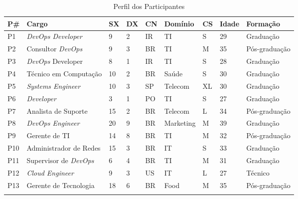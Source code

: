 \begin{table}[t]
\centering
\caption{Perfil dos Participantes}
\label{participant_table}
\begin{tabular}{|p{0.6cm}|p{3.4cm}|p{0.5cm}|p{0.5cm}|p{0.5cm}|p{1.7cm}|p{0.5cm}|p{1cm}|p{2.7cm}|}
\hline \centering
{\bf P\#} & {\bf Cargo} & {\bf SX} & {\bf DX} & {\bf CN} & {\bf Domínio} & {\bf CS} & {\bf Idade} & {\bf Formação} \\ \hline \centering
P1 & {\it DevOps Developer} & 9 & 2 & IR & \acrshort{TI} & S & 29 & Graduação \\ \hline \centering

P2 & Consultor {\it DevOps} & 9 & 3 & BR & \acrshort{TI} & M & 35 & Pós-graduação \\ \hline \centering

P3 & {\it DevOps} Developer & 8 & 1 & IR & \acrshort{TI} & S & 28 & Graduação \\ \hline \centering

P4 & Técnico em Computação & 10 & 2 & BR & Saúde & S & 30 & Graduação \\ \hline \centering

P5 & {\it Systems Engineer} & 10 & 3 & SP & Telecom & XL & 30 & Graduação \\ \hline \centering

P6 & {\it Developer} & 3 & 1 & PO & \acrshort{TI} & S & 27 & Graduação \\ \hline \centering

P7 & Analista de Suporte & 15 & 2 & BR & Telecom & L & 34 & Pós-graduação \\ \hline \centering

P8 & {\it DevOps Engineer} & 20 & 9 & BR & Marketing & M & 39 & Graduação \\ \hline \centering

P9 & Gerente de \acrshort{TI} & 14 & 8 & BR & \acrshort{TI} & M & 32 & Pós-graduação \\ \hline \centering

P10 & Administrador de Redes & 15 & 3 & BR & IT & S & 33 & Graduação \\ \hline \centering

P11 & Supervisor de {\it DevOps} & 6 & 4 & BR & \acrshort{TI} & M & 31 & Graduação \\ \hline \centering

P12 & {\it Cloud Engineer} & 9 & 3 & US & IT & L & 27 & Técnico \\ \hline \centering

P13 & Gerente de Tecnologia & 18 & 6 & BR & Food & M & 35 & Pós-graduação \\ \hline \centering


\end{tabular}
\end{table}
